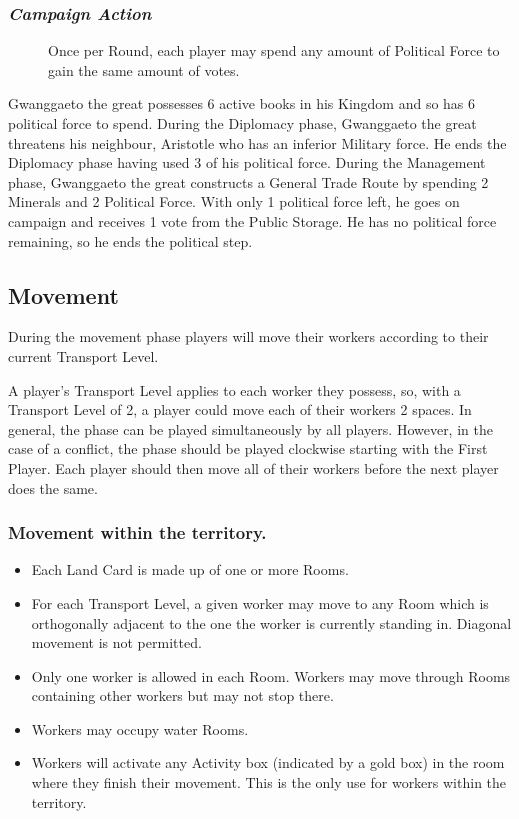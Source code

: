\documentclass[10pt,twocolumn]{article}
\begin{document}
\subsubsection*{\textit{Campaign Action}}
\begin{description}
\item[] Once per Round, each player may spend any amount of Political Force to gain the same amount of votes.
\end{description}
\begin{BoxExample}Gwanggaeto the great possesses 6 active books in his Kingdom and so has 6 political force to spend. During the Diplomacy phase, Gwanggaeto the great threatens his neighbour, Aristotle who has an inferior Military force. He ends the Diplomacy phase having used 3 of his political force. During the Management phase, Gwanggaeto the great constructs a General Trade Route by spending 2 Minerals and 2 Political Force. With only 1 political force left, he goes on campaign and receives 1 vote from the Public Storage. He has no political force remaining, so he ends the political step.\end{BoxExample}

\subsection{Movement}
During the movement phase players will move their workers according to their current Transport Level.


A player's Transport Level applies to each worker they possess, so, with a Transport Level of 2, a player could move each of their workers 2 spaces.
In general, the  phase can be played simultaneously by all players. However, in the case of a conflict, the phase should be played clockwise starting with the First Player. Each player should then move all of their workers before the next player does the same.

\subsubsection{Movement within the territory.}
\begin{itemize}
\item Each Land Card is made up of one or more Rooms.
\item For each Transport Level, a given worker may move to any Room which is orthogonally adjacent to the one the worker is currently standing in. Diagonal movement is not permitted.
\item Only one worker is allowed in each Room. Workers may move through Rooms containing other workers but may not stop there.
\item Workers may occupy water Rooms.
\item Workers will activate any Activity box (indicated by a gold box) in the room where they finish their movement. This is the only use for workers within the territory.
\end{itemize}
\end{document}
